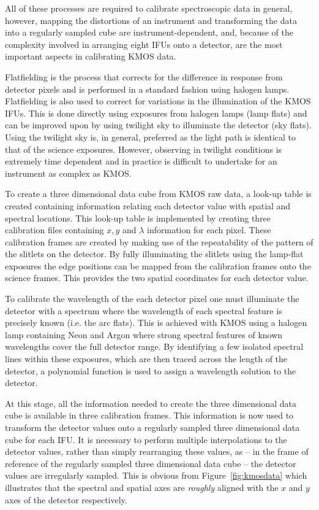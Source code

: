 All of these processes are required to calibrate spectroscopic data in general, however, mapping the distortions of an instrument and transforming the data into a regularly sampled cube are instrument-dependent, and,
because of the complexity involved in arranging eight IFUs onto a detector, are the most important aspects in calibrating KMOS data.

Flatfielding is the process that corrects for the difference in response from detector pixels and is performed in a standard fashion using halogen lamps.
Flatfielding is also used to correct for variations in the illumination of the KMOS IFUs.
This is done directly using exposures from halogen lamps (lamp flats) and can be improved upon by using twilight sky to illuminate the detector (sky flats).
Using the twilight sky is, in general, preferred as the light path is identical to that of the science exposures.
However, observing in twilight conditions is extremely time dependent and in practice is difficult to undertake for an instrument as complex as KMOS.

To create a three dimensional data cube from KMOS raw data, a look-up table is created containing information relating each detector value with spatial and spectral locations.
This look-up table is implemented by creating three calibration files containing $x, y$ and $\lambda$ information for each pixel.
These calibration frames are created by making use of the repeatability of the pattern of the slitlets on the detector.
By fully illuminating the slitlets using the lamp-flat exposures the edge positions can be mapped from the calibration frames onto the science frames.
This provides the two spatial coordinates for each detector value.

To calibrate the wavelength of the each detector pixel one must illuminate the detector with a spectrum where the wavelength of each spectral feature is precisely known (i.e. the arc flats).
This is achieved with KMOS using a halogen lamp containing Neon and Argon where strong spectral features of known wavelengths cover the full detector range.
By identifying a few isolated spectral lines within these exposures, which are then traced across the length of the detector, a polynomial function is used to assign a wavelength solution to the detector.


At this stage, all the information needed to create the three dimensional data cube is available in three calibration frames.
This information is now used to transform the detector values onto a regularly sampled three dimensional data cube for each IFU.
It is necessary to perform multiple interpolations to the detector values, rather than simply rearranging these values, as -- in the frame of reference of the regularly sampled three dimensional data cube -- the detector values are irregularly sampled.
This is obvious from Figure~\ref{fig:kmosdata} which illustrates that the spectral and spatial axes are \textit{roughly} aligned with the $x$ and $y$ axes of the detector respectively.

